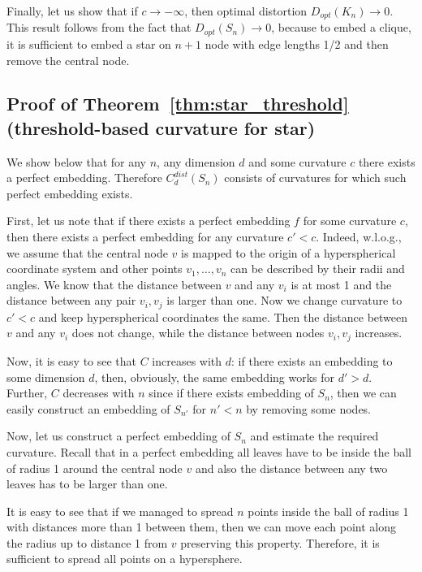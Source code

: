 \documentclass{article} %
\begin{document}
Finally, let us show that if $c \to -\infty$, then optimal distortion $D_{opt}(K_n) \to 0$. This result follows from the fact that $D_{opt}(S_n) \to 0$, because to embed a clique, it is sufficient to embed a star on $n+1$ node with edge lengths 1/2 and then remove the central node. 

\subsection{Proof of Theorem~\ref{thm:star_threshold} (threshold-based curvature for star)}\label{app:star_threshold}

We show below that for any $n$, any dimension $d$ and some curvature $c$ there exists a perfect embedding.
Therefore $C_d^{dist}(S_n)$ consists of curvatures for which such perfect embedding exists. 

First, let us note that if there exists a perfect embedding $f$ for some curvature $c$, then there exists a perfect embedding for any curvature $c' < c$. Indeed, w.l.o.g., we assume that the central node $v$ is mapped to the origin of a hyperspherical coordinate system and other points $v_1, \ldots, v_n$ can be described by their radii and angles. We know that the distance between $v$ and any $v_i$ is at most 1 and the distance between any pair $v_i, v_j$ is larger than one. Now we change curvature to $c' < c$ and keep hyperspherical coordinates the same. Then the distance between $v$ and any $v_i$ does not change, while the distance between nodes $v_i, v_j$ increases.

Now, it is easy to see that $C$ increases with $d$: if there exists an embedding to some dimension $d$, then, obviously, the same embedding works for $d' > d$. Further, $C$ decreases with $n$ since if there exists embedding of $S_n$, then we can easily construct an embedding of $S_{n'}$ for $n' < n$ by removing some nodes. 

Now, let us construct a perfect embedding of $S_n$
and estimate the required curvature.
Recall that in a perfect embedding all leaves have to be inside the ball of radius 1 around the central node $v$ and also the distance between any two leaves has to be larger than one. 

It is easy to see that if we managed to spread $n$ points inside the ball of radius 1 with distances more than 1 between them, then we can move each point along the radius up to distance 1 from $v$ preserving this property. Therefore, it is sufficient to spread all points on a hypersphere. 
\end{document}
